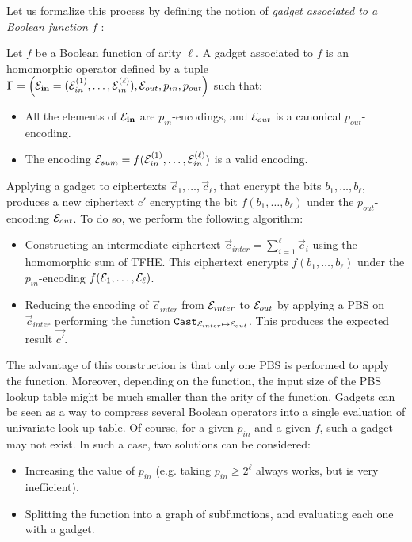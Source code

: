 Let us formalize this process by defining the notion of \textit{gadget associated to a Boolean function $f$} :
\begin{definition}[Gadget]
    Let $f$ be a Boolean function of arity $\ell$.
    A gadget associated to $f$ is an homomorphic operator defined by a tuple $\Gamma = \left ( \mathbf{\mathcal{E}_{in}} = (\mathcal{E}_{in}^{(1)}, \dots, \mathcal{E}_{in}^{(\ell)}), \mathcal{E}_{out}, p_{in}, p_{out} \right )$ such that:
    \begin{itemize}
        \item All the elements of $\mathbf{\mathcal{E}_{in}}$ are $p_{in}$-encodings, and $\mathcal{E}_{out}$ is a canonical $p_{out}$-encoding.
        \item The encoding $\mathcal{E}_{sum} = f(\mathcal{E}_{in}^{(1)}, \dots, \mathcal{E}_{in}^{(\ell)})$ is a valid encoding.
    \end{itemize}
Applying a gadget to ciphertexts  $\vec c_1, \dots, \vec c_\ell$, that encrypt the bits $b_1, \dots, b_\ell$, produces a new ciphertext $c'$ encrypting the bit $f(b_1, \dots, b_\ell)$ under the $p_{out}$-encoding $\mathcal{E}_{out}$. To do so, we perform the following algorithm:
\begin{itemize}
    \item Constructing an intermediate ciphertext $\vec{c}_{inter} = \sum_{i=1}^{\ell} \vec{c}_i$ using the homomorphic sum of TFHE. This ciphertext encrypts $f(b_1, \dots, b_\ell)$ under the $p_{in}$-encoding $f(\mathcal{E}_1, \dots, \mathcal{E}_\ell)$.
    \item Reducing the encoding of $\vec{c}_{inter}$ from $\mathcal{E}_{inter}$ to $\mathcal{E}_{out}$ by applying a PBS on $\vec{c}_{inter}$ performing the function $\texttt{Cast}_{\mathcal{E}_{inter} \mapsto \mathcal{E}_{out}}$. This produces the expected result $\vec{c'}$.
    \end{itemize}
\label{def:gadget}
\end{definition}


The advantage of this construction is that only one PBS is performed to apply the function. Moreover, depending on the function, the input size of the PBS lookup table might be much smaller than the arity of the function. Gadgets can be seen as a way to compress several Boolean operators into a single evaluation of univariate look-up table.
Of course, for a given $p_{in}$ and a given $f$, such a gadget may not exist. In such a case, two solutions can be considered:
\begin{itemize}
    \item Increasing the value of $p_{in}$ (e.g.  taking $p_{in} \ge 2^\ell$ always works, but is very inefficient).
    \item Splitting the function into a graph of subfunctions, and evaluating each one with a gadget.
\end{itemize}

